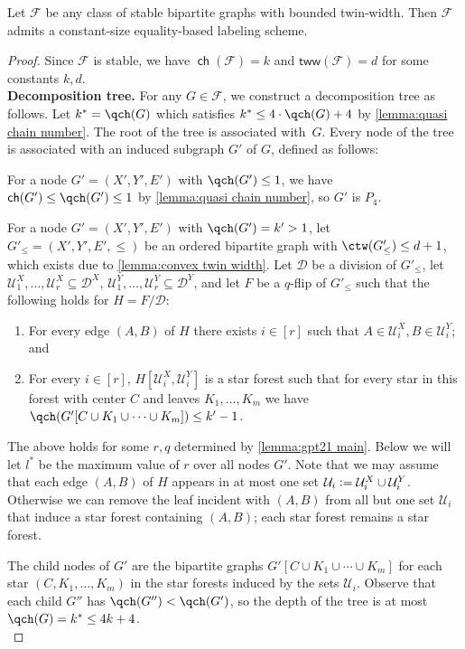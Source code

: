 \documentclass{theoretics}
\newcommand{\define}{\vcentcolon=}
\newcommand{\cD}{\ensuremath{\mathcal{D}}}
\newcommand{\cF}{\ensuremath{\mathcal{F}}}
\newcommand{\cU}{\ensuremath{\mathcal{U}}}
\newcommand{\tw}{\mathsf{tww}}
\DeclareMathOperator\ch{\mathsf{ch}}
\begin{document}
\begin{lemma}
\label{lemma:tw bipartite}
Let $\cF$ be any class of stable bipartite graphs with bounded twin-width. Then $\cF$ admits a
constant-size equality-based labeling scheme.
\end{lemma}
\begin{proof}
Since $\cF$ is stable, we have $\ch(\cF) = k$ and $\tw(\cF)=d$ for some constants $k,d$.\\

\noindent\textbf{Decomposition tree.}
For any $G \in \cF$, we construct a decomposition tree as follows. Let $k^* = \qch(G)$ which
satisfies $k^* \leq 4 \cdot \qch(G) + 4$ by \cref{lemma:quasi chain number}. The root of the tree is
associated with~$G$. Every node of the tree is associated with an induced subgraph $G'$ of $G$,
defined as follows:

For a node $G' = (X',Y',E')$ with $\qch(G') \leq 1$, we have $\ch(G') \leq \qch(G') \leq 1$ by
\cref{lemma:quasi chain number}, so $G'$ is $P_4$.

For a node $G' = (X',Y',E')$ with $\qch(G') = k' > 1$, let $G'_{\leq} = (X',Y',E',\leq)$ be an
ordered bipartite graph with $\ctw(G'_\leq) \leq d+1$, which exists due to \cref{lemma:convex twin
width}. Let $\cD$ be a division of $G'_\leq$, let $\cU^X_1, \dotsc, \cU^X_r \subseteq \cD^X$, $\cU^Y_1, \dotsc, \cU^Y_r \subseteq \cD^Y$, and let
$F$ be a $q$-flip of $G'_\leq$ such that the following holds for $H = F/\cD$:
\begin{enumerate}
\item For every edge $(A,B)$ of $H$ there exists $i \in [r]$ such that $A\in \cU^X_i, B\in \cU^Y_i$; and
\item For every $i\in[r]$, $H[\cU^X_i,\cU^Y_i]$ is a star forest such that for every star in this forest  with
center $C$ and leaves $K_1, \dotsc, K_m$ we have $\qch(G'[C \cup K_1 \cup \dotsm \cup K_m]) \leq
k'-1$.
\end{enumerate}
The above holds for some $r,q$ determined by \cref{lemma:gpt21 main}. Below we will let $l^*$ be
the maximum value of $r$ over all nodes $G'$.  Note that we may assume that each edge $(A,B)$ of
$H$ appears in at most one set $\cU_i\define \cU^X_i\cup\cU^Y_i$. Otherwise we can remove the leaf incident with $(A,B)$ from all but one set $\cU_i$ that induce a star forest containing $(A,B)$; each star forest remains a star forest.

The child nodes of $G'$ are the bipartite graphs $G'[C \cup K_1 \cup \dotsm \cup K_m]$ for each star
$(C, K_1, \dotsc, K_m)$ in the star forests induced by the sets $\cU_i$. 
Observe that each child $G''$ has $\qch(G'') < \qch(G')$, so the depth of the tree is at most
$\qch(G) = k^* \leq 4k + 4$.\\


\end{proof}
\end{document}
